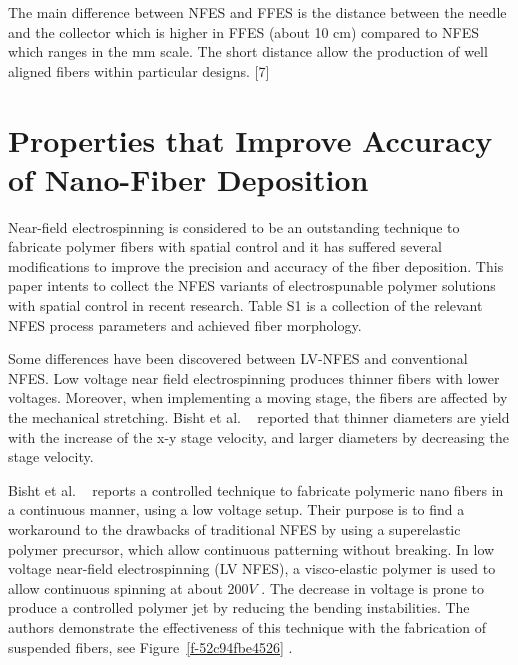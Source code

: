 \documentclass[5p,,preprint,12pt,twocolumn]{elsarticle}
\begin{document}
The main difference between NFES and FFES is the distance between the needle and the collector which is higher in FFES (about 10 cm) compared to NFES which ranges in the mm scale. The short distance allow the production of well aligned fibers within particular designs. [7]


    
\section{Properties that Improve Accuracy of Nano-Fiber Deposition}
Near-field electrospinning is considered to be an outstanding technique to fabricate polymer fibers with spatial control and it has suffered several modifications to improve the precision and accuracy of the fiber deposition. This paper intents to collect the NFES variants of electrospunable polymer solutions with spatial control in recent research. Table S1 is a collection of the relevant NFES process parameters and achieved fiber morphology.

Some differences have been discovered between LV-NFES and conventional NFES. Low voltage near field electrospinning produces thinner fibers with lower voltages. Moreover, when implementing a moving stage, the fibers are affected by the mechanical stretching. Bisht et al. \unskip~\cite{527120:11973130} reported that thinner diameters are yield with the increase of the x-y stage velocity, and larger diameters by decreasing the stage velocity.

Bisht et al. \unskip~\cite{527120:11973130} reports a controlled technique to fabricate polymeric nano fibers in a continuous manner, using a low voltage setup. Their purpose is to find a workaround to the drawbacks of traditional NFES by using a superelastic polymer precursor, which allow continuous patterning without breaking. In low voltage near-field electrospinning (LV NFES), a visco-elastic polymer is used to allow continuous spinning at about 200$V $ . The decrease in voltage is prone to produce a controlled polymer jet by reducing the bending instabilities. The authors demonstrate the effectiveness of this technique with the fabrication of suspended fibers, see Figure~\ref{f-52c94fbe4526} .
\end{document}
